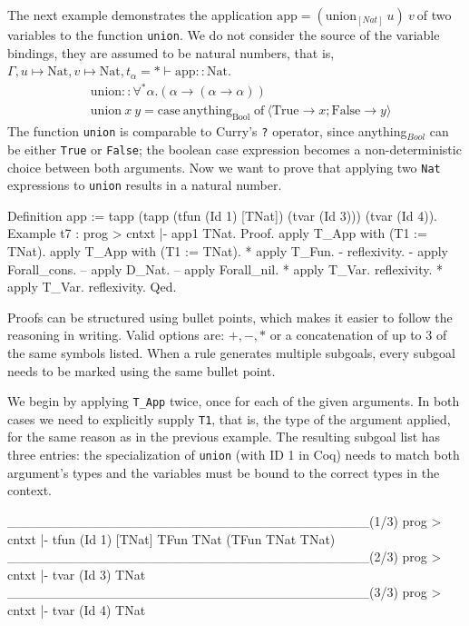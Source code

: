 \documentclass[fleqn, abstract=on]{scrreprt}
\newcommand{\coqinline}[1]{\texttt{#1}}
\begin{document}
\par \noindent
The next example demonstrates the application $\text{app} = (\text{union}_{[Nat]} \: u) \: v \:$of two variables to the function \texttt{union}. We do not consider the source of the variable bindings, they are assumed to be natural numbers, that is, $\Gamma, u \mapsto \text{Nat}, v \mapsto \text{Nat}, t_{\alpha} = * \vdash \text{app} :: \text{Nat}$.
\begin{align*}
&\text{union}::\forall^{*}\alpha.(\alpha \rightarrow (\alpha \rightarrow \alpha))\\
&\text{union}\: x \: y = \text{case}\: \text{anything}_{\text{Bool}} \; \text{of}\: \langle \text{True} \rightarrow x; \text{False} \rightarrow y\rangle
\end{align*}
The function \texttt{union} is comparable to Curry's \texttt{?} operator, since anything$_{Bool}$ can be either \texttt{True} or \texttt{False}; the boolean case expression becomes a non-deterministic choice between both arguments. Now we want to prove that applying two \texttt{Nat} expressions to \texttt{union} results in a natural number.
\begin{coqcode}
Definition app := tapp (tapp (tfun (Id 1) [TNat])
                             (tvar (Id 3)))
                       (tvar (Id 4)).    
Example t7 : prog > cntxt |- app1 \in TNat.              
Proof.
 apply T_App with (T1 := TNat). apply T_App with (T1 := TNat).
   * apply T_Fun.
     - reflexivity.
     - apply Forall_cons.
       -- apply D_Nat.
       -- apply Forall_nil.
   * apply T_Var. reflexivity.
   * apply T_Var. reflexivity.
Qed.
\end{coqcode}
Proofs can be structured using bullet points, which makes it easier to follow the reasoning in writing. Valid options are: $+, -, *$ or a concatenation of up to 3 of the same symbols listed. When a rule generates multiple subgoals, every subgoal needs to be marked using the same bullet point.
\par
We begin by applying \coqinline{T_App} twice, once for each of the given arguments. In both cases we need to explicitly supply \coqinline{T1}, that is, the type of the argument applied, for the same reason as in the previous example. The resulting subgoal list has three entries: the specialization of \texttt{union} (with ID 1 in Coq) needs to match both argument's types and the variables must be bound to the correct types in the context. 
\begin{coqcode}
______________________________________(1/3)
prog > cntxt |- tfun (Id 1) [TNat] \in TFun TNat (TFun TNat TNat)
______________________________________(2/3)
prog > cntxt |- tvar (Id 3) \in TNat
______________________________________(3/3)
prog > cntxt |- tvar (Id 4) \in TNat
\end{coqcode}
\end{document}
